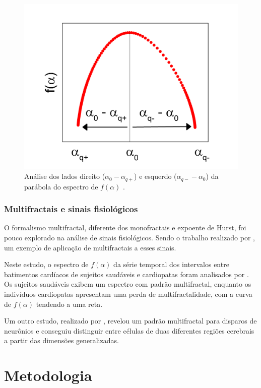 \documentclass{ufscThesis}
\begin{document}
\begin{figure}[!h]
\centering
\includegraphics[scale=0.3]{ladosparabola.png}
\caption{Análise dos lados direito ($\alpha_{0} - \alpha_{q+}$) e esquerdo ($\alpha_{q-} - \alpha_{0}$) da parábola do espectro de $f(\alpha)$ .}
\label{ladosparabola}
\end{figure}


\subsection{Multifractais e sinais fisiológicos}
O formalismo multifractal, diferente dos monofractais e expoente de Hurst, foi pouco explorado na análise de sinais fisiológicos. Sendo o trabalho realizado por , um exemplo de aplicação de multifractais a esses sinais. \par
Neste estudo, o espectro de $f(\alpha)$ da série temporal dos intervalos entre batimentos cardíacos de sujeitos saudáveis e cardiopatas foram analisados por . Os sujeitos saudáveis exibem um espectro com padrão multifractal, enquanto os indivíduos cardiopatas apresentam uma perda de multifractalidade, com a curva de $f(\alpha)$ tendendo a uma reta. \par
Um outro estudo, realizado por , revelou um padrão multifractal para disparos de neurônios e conseguiu distinguir entre células de duas diferentes regiões cerebrais a partir das dimensões generalizadas.

\chapter{Metodologia}
\end{document}
